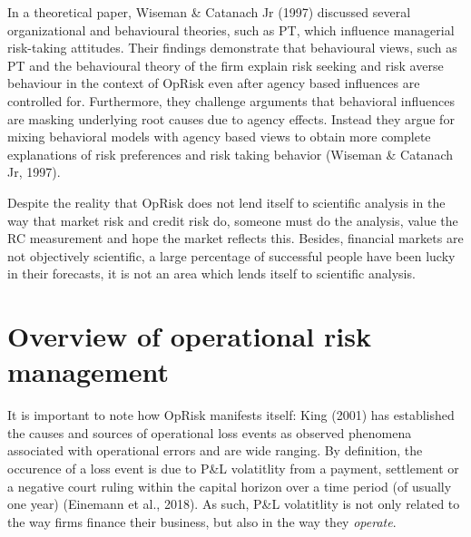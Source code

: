 \documentclass{DissertateUSU}
\begin{document}
In a theoretical paper, Wiseman \& Catanach Jr (1997) discussed several
organizational and behavioural theories, such as PT, which influence
managerial risk-taking attitudes. Their findings demonstrate that
behavioural views, such as PT and the behavioural theory of the firm
explain risk seeking and risk averse behaviour in the context of OpRisk
even after agency based influences are controlled for. Furthermore, they
challenge arguments that behavioral influences are masking underlying
root causes due to agency effects. Instead they argue for mixing
behavioral models with agency based views to obtain more complete
explanations of risk preferences and risk taking behavior (Wiseman \&
Catanach Jr, 1997). \medskip 

Despite the reality that OpRisk does not lend itself to scientific
analysis in the way that market risk and credit risk do, someone must do
the analysis, value the RC measurement and hope the market reflects
this. Besides, financial markets are not objectively scientific, a large
percentage of successful people have been lucky in their forecasts, it
is not an area which lends itself to scientific analysis.

\section{Overview of operational risk management}
\label{sec:Overview of operational risk management}

It is important to note how OpRisk manifests itself: King (2001) has
established the causes and sources of operational loss events as
observed phenomena associated with operational errors and are wide
ranging. By definition, the occurence of a loss event is due to P\&L
volatitlity from a payment, settlement or a negative court ruling within
the capital horizon over a time period (of usually one year) (Einemann
et al., 2018). As such, P\&L volatitlity is not only related to the way
firms finance their business, but also in the way they
\emph{operate}.\medskip 
\end{document}
